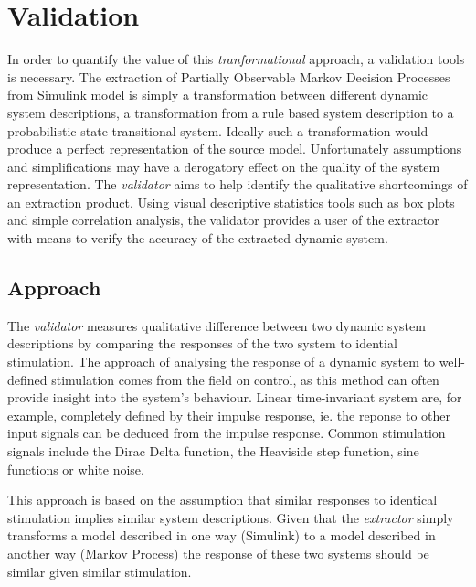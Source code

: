 \section{Validation}
\label{validation}

In order to quantify the value of this \textit{tranformational} approach, a validation tools is necessary. The extraction of Partially Observable Markov Decision Processes from Simulink model is simply a transformation between different dynamic system descriptions, a transformation from a rule based system description to a probabilistic state transitional system. Ideally such a transformation would produce a perfect representation of the source model. Unfortunately assumptions and simplifications may have a derogatory effect on the quality of the system representation. The \textit{validator} aims to help identify the qualitative shortcomings of an extraction product. Using visual descriptive statistics tools such as box plots and simple correlation analysis, the validator provides a user of the extractor with means to verify the accuracy of the extracted dynamic system.



\subsection{Approach}

The \textit{validator} measures qualitative difference between two dynamic system descriptions by comparing the responses of the two system to idential stimulation. The approach of analysing the response of a dynamic system to well-defined stimulation comes from the field on control, as this method can often provide insight into the system's behaviour. Linear time-invariant system are, for example, completely defined by their impulse response, ie. the reponse to other input signals can be deduced from the impulse response. Common stimulation signals include the Dirac Delta function, the Heaviside step function, sine functions or white noise.

This approach is based on the assumption that similar responses to identical stimulation implies similar system descriptions. Given that the \textit{extractor} simply transforms a model described in one way (Simulink) to a model described in another way (Markov Process) the response of these two systems should be similar given similar stimulation.

